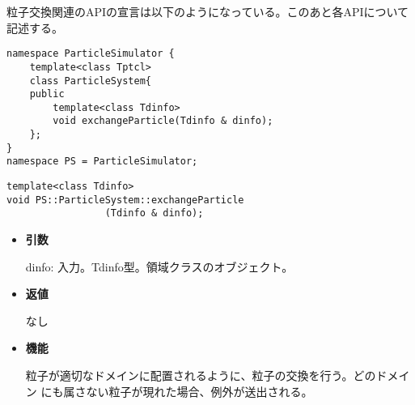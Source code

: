 \label{sec:writeParticleBinary}


粒子交換関連のAPIの宣言は以下のようになっている。このあと各APIについて
記述する。
\begin{lstlisting}[caption=ParticleSystem4]
namespace ParticleSimulator {
    template<class Tptcl>
    class ParticleSystem{
    public
        template<class Tdinfo>
        void exchangeParticle(Tdinfo & dinfo);
    };
}
namespace PS = ParticleSimulator;
\end{lstlisting}



\begin{screen}
\begin{verbatim}
template<class Tdinfo>
void PS::ParticleSystem::exchangeParticle
                 (Tdinfo & dinfo);
\end{verbatim}
\end{screen}

\begin{itemize}

\item {\bf 引数}

dinfo: 入力。Tdinfo型。領域クラスのオブジェクト。

\item {\bf 返値}

なし

\item {\bf 機能}

粒子が適切なドメインに配置されるように、粒子の交換を行う。どのドメイン
にも属さない粒子が現れた場合、例外が送出される。

\end{itemize}
